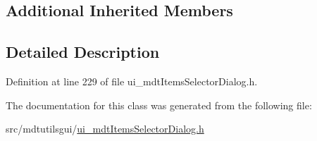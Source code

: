 \subsection*{Additional Inherited Members}


\subsection{Detailed Description}


Definition at line 229 of file ui\-\_\-mdt\-Items\-Selector\-Dialog.\-h.



The documentation for this class was generated from the following file\-:\begin{DoxyCompactItemize}
\item 
src/mdtutilsgui/\hyperlink{ui__mdt_items_selector_dialog_8h}{ui\-\_\-mdt\-Items\-Selector\-Dialog.\-h}\end{DoxyCompactItemize}
